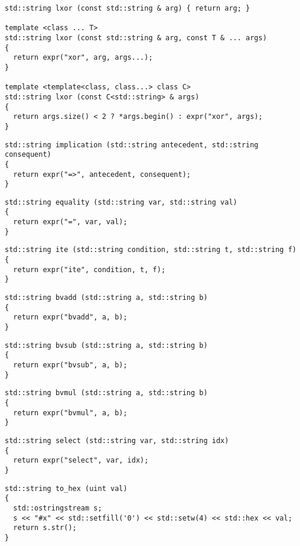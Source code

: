 \begin{lstlisting}[style=c++]
std::string lxor (const std::string & arg) { return arg; }

template <class ... T>
std::string lxor (const std::string & arg, const T & ... args)
{
  return expr("xor", arg, args...);
}

template <template<class, class...> class C>
std::string lxor (const C<std::string> & args)
{
  return args.size() < 2 ? *args.begin() : expr("xor", args);
}
\end{lstlisting}

\begin{lstlisting}[style=c++]
std::string implication (std::string antecedent, std::string consequent)
{
  return expr("=>", antecedent, consequent);
}
\end{lstlisting}

\begin{lstlisting}[style=c++]
std::string equality (std::string var, std::string val)
{
  return expr("=", var, val);
}
\end{lstlisting}

\begin{lstlisting}[style=c++]
std::string ite (std::string condition, std::string t, std::string f)
{
  return expr("ite", condition, t, f);
}
\end{lstlisting}

\begin{lstlisting}[style=c++]
std::string bvadd (std::string a, std::string b)
{
  return expr("bvadd", a, b);
}
\end{lstlisting}

\begin{lstlisting}[style=c++]
std::string bvsub (std::string a, std::string b)
{
  return expr("bvsub", a, b);
}
\end{lstlisting}

\begin{lstlisting}[style=c++]
std::string bvmul (std::string a, std::string b)
{
  return expr("bvmul", a, b);
}
\end{lstlisting}

\begin{lstlisting}[style=c++]
std::string select (std::string var, std::string idx)
{
  return expr("select", var, idx);
}
\end{lstlisting}

\begin{lstlisting}[style=c++]
std::string to_hex (uint val)
{
  std::ostringstream s;
  s << "#x" << std::setfill('0') << std::setw(4) << std::hex << val;
  return s.str();
}
\end{lstlisting}

